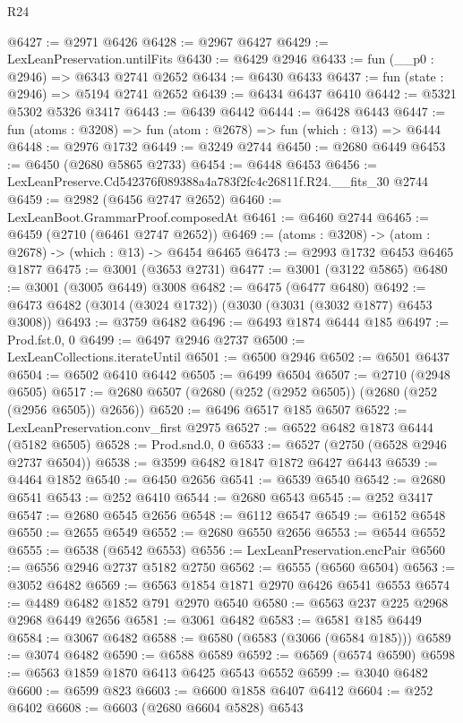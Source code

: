 \begin{lexlean}{R24}
\begin{coremodule}
@6427 := @2971 @6426
@6428 := @2967 @6427
@6429 := LexLeanPreservation.untilFits
@6430 := @6429 @2946
@6433 := fun (__p0 : @2946) => @6343 @2741 @2652
@6434 := @6430 @6433
@6437 := fun (state : @2946) => @5194 @2741 @2652
@6439 := @6434 @6437 @6410
@6442 := @5321 @5302 @5326 @3417
@6443 := @6439 @6442
@6444 := @6428 @6443
@6447 := fun (atoms : @3208) => fun (atom : @2678) => fun (which : @13) => @6444
@6448 := @2976 @1732
@6449 := @3249 @2744
@6450 := @2680 @6449
@6453 := @6450 (@2680 @5865 @2733)
@6454 := @6448 @6453
@6456 := LexLeanPreserve.Cd542376f089388a4a783f2fc4c26811f.R24.__fits_30 @2744
@6459 := @2982 (@6456 @2747 @2652)
@6460 := LexLeanBoot.GrammarProof.composedAt
@6461 := @6460 @2744
@6465 := @6459 (@2710 (@6461 @2747 @2652))
@6469 := (atoms : @3208) -> (atom : @2678) -> (which : @13) -> @6454 @6465
@6473 := @2993 @1732 @6453 @6465 @1877
@6475 := @3001 (@3653 @2731)
@6477 := @3001 (@3122 @5865)
@6480 := @3001 (@3005 @6449) @3008
@6482 := @6475 (@6477 @6480)
@6492 := @6473 @6482 (@3014 (@3024 @1732)) (@3030 (@3031 (@3032 @1877) @6453 @3008))
@6493 := @3759 @6482
@6496 := @6493 @1874 @6444 @185
@6497 := Prod.fst.{0, 0}
@6499 := @6497 @2946 @2737
@6500 := LexLeanCollections.iterateUntil
@6501 := @6500 @2946
@6502 := @6501 @6437
@6504 := @6502 @6410 @6442
@6505 := @6499 @6504
@6507 := @2710 (@2948 @6505)
@6517 := @2680 @6507 (@2680 (@252 (@2952 @6505)) (@2680 (@252 (@2956 @6505)) @2656))
@6520 := @6496 @6517 @185 @6507
@6522 := LexLeanPreservation.conv_first @2975
@6527 := @6522 @6482 @1873 @6444 (@5182 @6505)
@6528 := Prod.snd.{0, 0}
@6533 := @6527 (@2750 (@6528 @2946 @2737 @6504))
@6538 := @3599 @6482 @1847 @1872 @6427 @6443
@6539 := @4464 @1852
@6540 := @6450 @2656
@6541 := @6539 @6540
@6542 := @2680 @6541
@6543 := @252 @6410
@6544 := @2680 @6543
@6545 := @252 @3417
@6547 := @2680 @6545 @2656
@6548 := @6112 @6547
@6549 := @6152 @6548
@6550 := @2655 @6549
@6552 := @2680 @6550 @2656
@6553 := @6544 @6552
@6555 := @6538 (@6542 @6553)
@6556 := LexLeanPreservation.encPair
@6560 := @6556 @2946 @2737 @5182 @2750
@6562 := @6555 (@6560 @6504)
@6563 := @3052 @6482
@6569 := @6563 @1854 @1871 @2970 @6426 @6541 @6553
@6574 := @4489 @6482 @1852 @791 @2970 @6540
@6580 := @6563 @237 @225 @2968 @2968 @6449 @2656
@6581 := @3061 @6482
@6583 := @6581 @185 @6449
@6584 := @3067 @6482
@6588 := @6580 (@6583 (@3066 (@6584 @185)))
@6589 := @3074 @6482
@6590 := @6588 @6589
@6592 := @6569 (@6574 @6590)
@6598 := @6563 @1859 @1870 @6413 @6425 @6543 @6552
@6599 := @3040 @6482
@6600 := @6599 @823
@6603 := @6600 @1858 @6407 @6412
@6604 := @252 @6402
@6608 := @6603 (@2680 @6604 @5828) @6543

\end{coremodule}
\end{lexlean}
